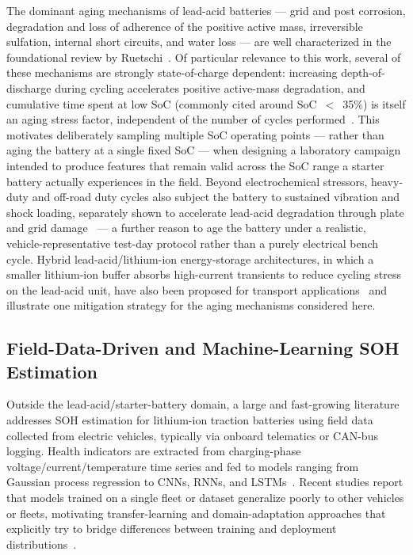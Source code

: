 \documentclass[conference]{IEEEtran}
\begin{document}
The dominant aging mechanisms of lead-acid batteries --- grid and post corrosion, degradation and loss of adherence of the positive active mass, irreversible sulfation, internal short circuits, and water loss --- are well characterized in the foundational review by Ruetschi~\cite{ruetschi_aging}. Of particular relevance to this work, several of these mechanisms are strongly state-of-charge dependent: increasing depth-of-discharge during cycling accelerates positive active-mass degradation, and cumulative time spent at low SoC (commonly cited around SoC~$<$~35\%) is itself an aging stress factor, independent of the number of cycles performed~\cite{ruetschi_aging,lead_acid_impedance_aging}. This motivates deliberately sampling multiple SoC operating points --- rather than aging the battery at a single fixed SoC --- when designing a laboratory campaign intended to produce features that remain valid across the SoC range a starter battery actually experiences in the field. Beyond electrochemical stressors, heavy-duty and off-road duty cycles also subject the battery to sustained vibration and shock loading, separately shown to accelerate lead-acid degradation through plate and grid damage~\cite{heVibrationTestMethods2014} --- a further reason to age the battery under a realistic, vehicle-representative test-day protocol rather than a purely electrical bench cycle. Hybrid lead-acid/lithium-ion energy-storage architectures, in which a smaller lithium-ion buffer absorbs high-current transients to reduce cycling stress on the lead-acid unit, have also been proposed for transport applications~\cite{zauReviewBatteryManagement2020} and illustrate one mitigation strategy for the aging mechanisms considered here.

\subsection{Field-Data-Driven and Machine-Learning SOH Estimation}

Outside the lead-acid/starter-battery domain, a large and fast-growing literature addresses SOH estimation for lithium-ion traction batteries using field data collected from electric vehicles, typically via onboard telematics or CAN-bus logging. Health indicators are extracted from charging-phase voltage/current/temperature time series and fed to models ranging from Gaussian process regression to CNNs, RNNs, and LSTMs~\cite{multimodal_ev_field,domain_ml_soh}. Recent studies report that models trained on a single fleet or dataset generalize poorly to other vehicles or fleets, motivating transfer-learning and domain-adaptation approaches that explicitly try to bridge differences between training and deployment distributions~\cite{robust_soh_buses,transferable_capacity_estimation}.
\end{document}
